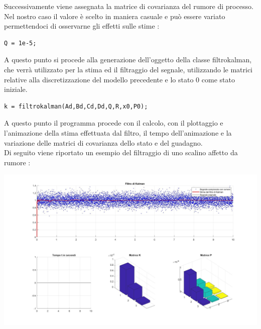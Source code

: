 Successivamente viene assegnata la matrice di covarianza del rumore di processo. Nel nostro caso il valore è scelto in maniera casuale e può essere variato permettendoci di osservarne gli effetti sulle stime :
\begin{lstlisting}[frame=single]
Q = 1e-5;
\end{lstlisting}
A questo punto si procede alla generazione dell'oggetto della classe filtrokalman, che verrà utilizzato per la stima ed il filtraggio del segnale, utilizzando le matrici relative alla discretizzazione del modello precedente e lo stato 0 come stato iniziale.
\begin{lstlisting}[frame=single]
k = filtrokalman(Ad,Bd,Cd,Dd,Q,R,x0,P0);
\end{lstlisting}

A questo punto il programma procede con il calcolo, con il plottaggio e l'animazione della stima effettuata dal filtro, il tempo dell'animazione e la variazione delle matrici di covarianza dello stato e del guadagno.\\
Di seguito viene riportato un esempio del filtraggio di uno scalino affetto da rumore :


\includegraphics[scale=.5]{immaginiMain/esempio.jpg} 




\newpage